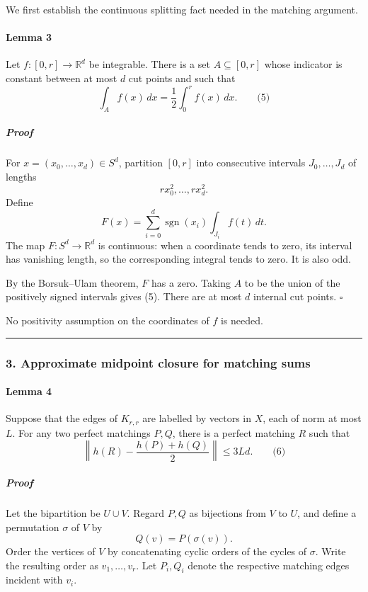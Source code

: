 \documentclass[
  11pt,
  a4paper,
]{article}
\begin{document}
We first establish the continuous splitting fact needed in the matching
argument.

\paragraph{Lemma 3}\label{lemma-3}

Let \(f:[0,r]\to\mathbb R^d\) be integrable. There is a set
\(A\subseteq[0,r]\) whose indicator is constant between at most \(d\)
cut points and such that \[
\int_A f(x)\,dx=\frac12\int_0^r f(x)\,dx.
\qquad\text{(5)}
\]

\subparagraph{Proof}\label{proof}

For \(x=(x_0,\ldots,x_d)\in S^d\), partition \([0,r]\) into consecutive
intervals \(J_0,\ldots,J_d\) of lengths \[
r x_0^2,\ldots,r x_d^2.
\] Define \[
F(x)=\sum_{i=0}^d \operatorname{sgn}(x_i)\int_{J_i}f(t)\,dt.
\] The map \(F:S^d\to\mathbb R^d\) is continuous: when a coordinate
tends to zero, its interval has vanishing length, so the corresponding
integral tends to zero. It is also odd.

By the Borsuk--Ulam theorem, \(F\) has a zero. Taking \(A\) to be the
union of the positively signed intervals gives (5). There are at most
\(d\) internal cut points. \(\square\)

No positivity assumption on the coordinates of \(f\) is needed.

\begin{center}\rule{0.5\linewidth}{0.5pt}\end{center}

\subsubsection{3. Approximate midpoint closure for matching
sums}\label{approximate-midpoint-closure-for-matching-sums}

\paragraph{Lemma 4}\label{lemma-4}

Suppose that the edges of \(K_{r,r}\) are labelled by vectors in \(X\),
each of norm at most \(L\). For any two perfect matchings \(P,Q\), there
is a perfect matching \(R\) such that \[
\left\|h(R)-\frac{h(P)+h(Q)}2\right\|\le 3Ld.
\qquad\text{(6)}
\]

\subparagraph{Proof}\label{proof-1}

Let the bipartition be \(U\cup V\). Regard \(P,Q\) as bijections from
\(V\) to \(U\), and define a permutation \(\sigma\) of \(V\) by \[
Q(v)=P(\sigma(v)).
\] Order the vertices of \(V\) by concatenating cyclic orders of the
cycles of \(\sigma\). Write the resulting order as \(v_1,\ldots,v_r\).
Let \(P_i,Q_i\) denote the respective matching edges incident with
\(v_i\).
\end{document}
